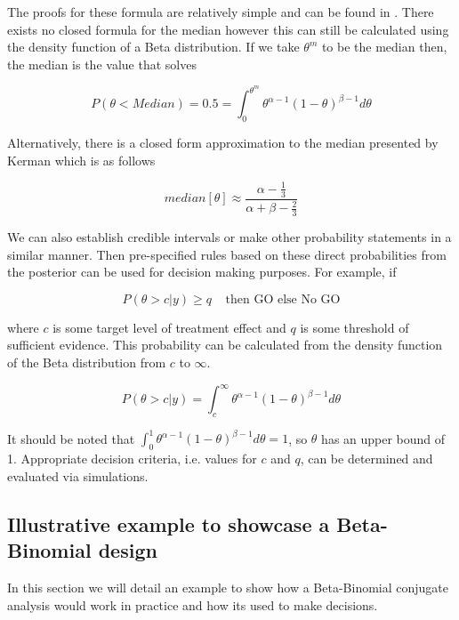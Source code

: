 The proofs for these formula are relatively simple and can be found in \cite{sochBookStatisticalProofs2020}. There exists no closed formula for the median however this can still be calculated using the density function of a Beta distribution. If we take $\theta^m$ to be the median then, the median is the value that solves 

\begin{equation}
	P(\theta < Median) = 0.5 = \int_{0}^{\theta^m} \theta^{\alpha-1}(1-\theta)^{\beta-1}d\theta
\end{equation}

Alternatively, there is a closed form approximation to the median presented by Kerman \cite{kermanClosedformApproximationMedian2011} which is as follows 

\begin{equation}
	median[\theta] \approx \frac{\alpha - \frac{1}{3}}{\alpha + \beta - \frac{2}{3}}
\end{equation}

We can also establish credible intervals or make other probability statements in a similar manner. 
Then pre-specified rules based on these direct probabilities from the posterior can be used for decision making purposes. For example, if 

\begin{equation}
	P(\theta > c |y) \geq q  \; \; \; \; \text{then GO else No GO}
\end{equation}


where $c$ is some target level of treatment effect and $q$ is some threshold of sufficient evidence. This probability can be calculated from the density function of the Beta distribution from $c$ to $\infty$. 

\begin{equation}
	P(\theta > c | y) = \int_{c}^{\infty}\theta^{\alpha-1}(1-\theta)^{\beta-1}d\theta
\end{equation}

It should be noted that $\int_{0}^{1}\theta^{\alpha-1}(1-\theta)^{\beta-1}d\theta = 1$, so $\theta$ has an upper bound of 1. Appropriate decision criteria, i.e. values for $c$ and $q$, can be determined and evaluated via simulations.


\subsection{Illustrative example to showcase a Beta-Binomial design} 
In this section we will detail an example to show how a Beta-Binomial conjugate analysis would work in practice and how its used to make decisions. 


